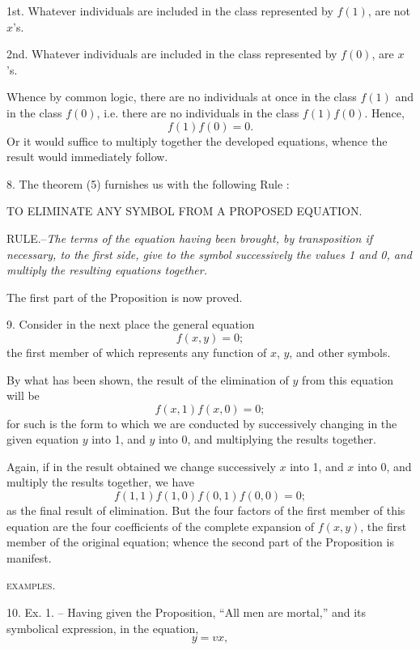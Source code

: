 \documentclass[oneside]{book}
\begin{document}
1st. Whatever individuals are included in the class represented by $f(1)$, are not $x$'s.

2nd. Whatever individuals are included in the class represented
by $f(0)$, are $x$'s.

Whence by common logic, there are no individuals at once
in the class $f(1)$ and in the class $f(0)$, i.e. there are no individuals
in the class $f(1)f(0)$. Hence,
\begin{equation}
     f(1)f(0) = 0.
\end{equation}
Or it would suffice to multiply together the developed equations,
whence the result would immediately follow.

8. The theorem (5) furnishes us with the following Rule :

TO ELIMINATE ANY SYMBOL FROM A PROPOSED EQUATION.

RULE.--\textit{The terms of the equation having been brought, by
transposition if necessary, to the first side, give to the symbol
successively the values 1 and 0, and multiply the resulting equations
together.}

The first part of the Proposition is now proved.

9. Consider in the next place the general equation
\[
     f(x,y) = 0;
\]
the first member of which represents any function of $x$, $y$, and
other symbols.

By what has been shown, the result of the elimination of $y$
from this equation will be
\[
     f(x,1)f(x,0) = 0;
\]
for such is the form to which we are conducted by successively
changing in the given equation $y$ into 1, and $y$ into 0, and
multiplying the results together.

Again, if in the result obtained we change successively $x$ into
1, and $x$ into 0, and multiply the results together, we have
\begin{equation}
     f(1,1)f(1,0)f(0,1)f(0,0) = 0;
\end{equation}
as the final result of elimination.
But the four factors of the first member of this equation are
the four coefficients of the complete expansion of $f(x, y)$, the
first member of the original equation; whence the second part of
the Proposition is manifest.

\begin{center}
\textsc{examples}.
\end{center}

10. Ex. 1. -- Having given the Proposition, ``All men are
mortal,'' and its symbolical expression, in the equation,
\[
y = vx,
\]
\end{document}
